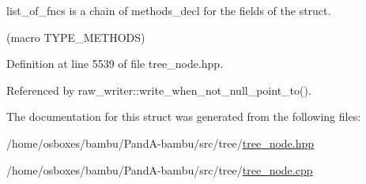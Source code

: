 list\+\_\+of\+\_\+fncs is a chain of methods\+\_\+decl for the fields of the struct. 

(macro T\+Y\+P\+E\+\_\+\+M\+E\+T\+H\+O\+DS) 

Definition at line 5539 of file tree\+\_\+node.\+hpp.



Referenced by raw\+\_\+writer\+::write\+\_\+when\+\_\+not\+\_\+null\+\_\+point\+\_\+to().



The documentation for this struct was generated from the following files\+:\begin{DoxyCompactItemize}
\item 
/home/osboxes/bambu/\+Pand\+A-\/bambu/src/tree/\hyperlink{tree__node_8hpp}{tree\+\_\+node.\+hpp}\item 
/home/osboxes/bambu/\+Pand\+A-\/bambu/src/tree/\hyperlink{tree__node_8cpp}{tree\+\_\+node.\+cpp}\end{DoxyCompactItemize}
